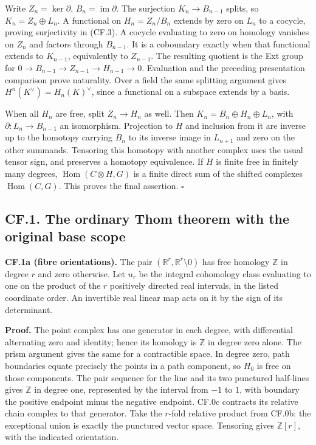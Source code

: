 \documentclass[
  11pt,
]{article}
\begin{document}
Write \(Z_n=\ker\partial\), \(B_n=\operatorname{im}\partial\). The
surjection \(K_n\to B_{n-1}\) splits, so \(K_n=Z_n\oplus L_n\). A
functional on \(H_n=Z_n/B_n\) extends by zero on \(L_n\) to a cocycle,
proving surjectivity in (CF.3). A cocycle evaluating to zero on homology
vanishes on \(Z_n\) and factors through \(B_{n-1}\). It is a coboundary
exactly when that functional extends to \(K_{n-1}\), equivalently to
\(Z_{n-1}\). The resulting quotient is the Ext group for
\(0\to B_{n-1}\to Z_{n-1}\to H_{n-1}\to0\). Evaluation and the preceding
presentation comparison prove naturality. Over a field the same
splitting argument gives \(H^n(K^\vee)=H_n(K)^\vee\), since a functional
on a subspace extends by a basis.

When all \(H_n\) are free, split \(Z_n\to H_n\) as well. Then
\(K_n=B_n\oplus H_n\oplus L_n\), with \(\partial:L_n\to B_{n-1}\) an
isomorphism. Projection to \(H\) and inclusion from it are inverse up to
the homotopy carrying \(B_n\) to its inverse image in \(L_{n+1}\) and
zero on the other summands. Tensoring this homotopy with another complex
uses the usual tensor sign, and preserves a homotopy equivalence. If
\(H\) is finite free in finitely many degrees,
\(\operatorname{Hom}(C\otimes H,G)\) is a finite direct sum of the
shifted complexes \(\operatorname{Hom}(C,G)\). This proves the final
assertion. \(\square\)

\subsection{CF.1. The ordinary Thom theorem with the original base
scope}\label{cf.1.-the-ordinary-thom-theorem-with-the-original-base-scope}

\textbf{CF.1a (fibre orientations).} The pair
\((\mathbb R^r,\mathbb R^r\setminus0)\) has free homology \(\mathbb Z\)
in degree \(r\) and zero otherwise. Let \(u_r\) be the integral
cohomology class evaluating to one on the product of the \(r\)
positively directed real intervals, in the listed coordinate order. An
invertible real linear map acts on it by the sign of its determinant.

\textbf{Proof.} The point complex has one generator in each degree, with
differential alternating zero and identity; hence its homology is
\(\mathbb Z\) in degree zero alone. The prism argument gives the same
for a contractible space. In degree zero, path boundaries equate
precisely the points in a path component, so \(H_0\) is free on those
components. The pair sequence for the line and its two punctured
half-lines gives \(\mathbb Z\) in degree one, represented by the
interval from \(-1\) to \(1\), with boundary the positive endpoint minus
the negative endpoint. CF.0c contracts its relative chain complex to
that generator. Take the \(r\)-fold relative product from CF.0b: the
exceptional union is exactly the punctured vector space. Tensoring gives
\(\mathbb Z[r]\), with the indicated orientation.
\end{document}
